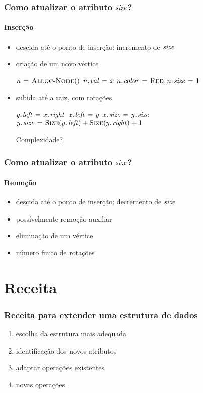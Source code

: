 \documentclass{beamer}
\begin{document}
\begin{frame}
\frametitle{Como atualizar o atributo $\id{size}$?}
\framesubtitle{Inserção}

\begin{itemize}
\item descida até o ponto de inserção: incremento de $\id{size}$
\pause\item criação de um novo vértice
\begin{codebox}
\li $n \mathrel{\hspace{1pt}=\hspace{1pt}} \textnormal{\scshape Alloc-Node}()$
\li $\attrib{n}{val} \gets x$
\li $\attrib{n}{color} \gets \const{Red}$
\li $\attrib{n}{size} \gets 1$
\end{codebox}
\pause\item subida até a raiz, com rotações
\begin{codebox}
\zi {}
\li $\attrib{y}{left} \gets \attrib{x}{right}$
\li $\attrib{x}{left} \gets y$
\li $\attrib{x}{size} \gets \attrib{y}{size}$
\li $\attrib{y}{size} \gets \proc{Size}(\attrib{y}{left}) + \proc{Size}(\attrib{y}{right}) + 1$
\end{codebox}
\pause\alert{Complexidade?}
\end{itemize}
\end{frame}

\begin{frame}
\frametitle{Como atualizar o atributo $\id{size}$?}
\framesubtitle{Remoção}

\begin{itemize}
\item descida até o ponto de inserção: decremento de $\id{size}$  
\item possívelmente remoção auxiliar
\item eliminação de um vértice \only<2>{\alert{$O(1)$}}
\item número finito de rotações 
\end{itemize}

\end{frame}

\section{Receita}
\begin{frame}
\frametitle{Receita para extender uma estrutura de dados}

\begin{enumerate}
\item escolha da estrutura mais adequada
\item identificação dos novos atributos
\item adaptar operações existentes
\item novas operações
\end{enumerate}

\end{frame}
\end{document}
